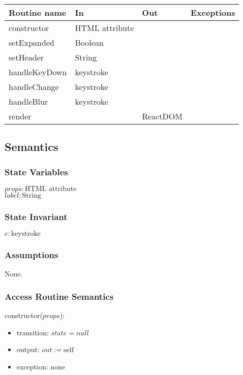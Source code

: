 \documentclass[12pt, titlepage]{article}
\begin{document}
\begin{tabular}{| l | l | l | l |}
  \hline
  \textbf{Routine name} & \textbf{In} & \textbf{Out} & \textbf{Exceptions}\\
  \hline
  constructor & HTML attribute & ~ & ~\\
  \hline
  setExpanded & Boolean & ~ & ~\\
  \hline
  setHeader & String & ~ & ~\\
  \hline
  handleKeyDown & keystroke & ~ & ~\\
  \hline
  handleChange & keystroke & ~ & ~\\
  \hline
  handleBlur & keystroke & ~ & ~\\
  \hline
  render & ~ & ReactDOM & ~\\
  \hline
\end{tabular}

\subsection{Semantics}

\subsubsection{State Variables}

$\mathit{props}: \text{HTML attribute}$\\
$\mathit{label}: \text{String}$

\subsubsection{State Invariant}

$\mathit{e}: \text{keystroke}$

\subsubsection{Assumptions}

None.

\subsubsection{Access Routine Semantics}

\noindent constructor($props$):
\begin{itemize}
\item transition: $\mathit{state} = null$
\item output: $out := \mbox{self}$
\item exception: none
\end{itemize}
\end{document}
